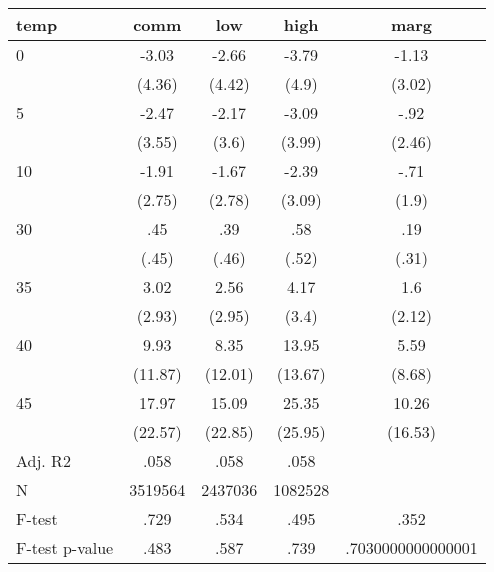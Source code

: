 \documentclass[]{article}
\begin{document}
\begin{tabular}{lcccc} \hline
temp & comm & low & high & marg \\ \hline
0 & -3.03 & -2.66 & -3.79 & -1.13 \\
 & (4.36) & (4.42) & (4.9) & (3.02) \\
5 & -2.47 & -2.17 & -3.09 & -.92 \\
 & (3.55) & (3.6) & (3.99) & (2.46) \\
10 & -1.91 & -1.67 & -2.39 & -.71 \\
 & (2.75) & (2.78) & (3.09) & (1.9) \\
30 & .45 & .39 & .58 & .19 \\
 & (.45) & (.46) & (.52) & (.31) \\
35 & 3.02 & 2.56 & 4.17 & 1.6 \\
 & (2.93) & (2.95) & (3.4) & (2.12) \\
40 & 9.93 & 8.35 & 13.95 & 5.59 \\
 & (11.87) & (12.01) & (13.67) & (8.68) \\
45 & 17.97 & 15.09 & 25.35 & 10.26 \\
 & (22.57) & (22.85) & (25.95) & (16.53) \\
\hline Adj. R2 & .058 & .058 & .058 &  \\
N & 3519564 & 2437036 & 1082528 &  \\
F-test & .729 & .534 & .495 & .352 \\
 F-test p-value & .483 & .587 & .739 & .7030000000000001 \\ \hline
\end{tabular}
\end{document}
